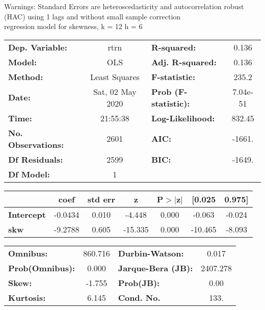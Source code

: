 Warnings: \newline
 [1] Standard Errors are heteroscedasticity and autocorrelation robust (HAC) using 1 lags and without small sample correction\\ 

regression model for skewness, k = 12 h = 6\begin{center}
\begin{tabular}{lclc}
\toprule
\textbf{Dep. Variable:}    &       rtrn       & \textbf{  R-squared:         } &     0.136   \\
\textbf{Model:}            &       OLS        & \textbf{  Adj. R-squared:    } &     0.136   \\
\textbf{Method:}           &  Least Squares   & \textbf{  F-statistic:       } &     235.2   \\
\textbf{Date:}             & Sat, 02 May 2020 & \textbf{  Prob (F-statistic):} &  7.04e-51   \\
\textbf{Time:}             &     21:55:38     & \textbf{  Log-Likelihood:    } &    832.45   \\
\textbf{No. Observations:} &        2601      & \textbf{  AIC:               } &    -1661.   \\
\textbf{Df Residuals:}     &        2599      & \textbf{  BIC:               } &    -1649.   \\
\textbf{Df Model:}         &           1      & \textbf{                     } &             \\
\bottomrule
\end{tabular}
\begin{tabular}{lcccccc}
                   & \textbf{coef} & \textbf{std err} & \textbf{z} & \textbf{P$> |$z$|$} & \textbf{[0.025} & \textbf{0.975]}  \\
\midrule
\textbf{Intercept} &      -0.0434  &        0.010     &    -4.448  &         0.000        &       -0.063    &       -0.024     \\
\textbf{skw}       &      -9.2788  &        0.605     &   -15.335  &         0.000        &      -10.465    &       -8.093     \\
\bottomrule
\end{tabular}
\begin{tabular}{lclc}
\textbf{Omnibus:}       & 860.716 & \textbf{  Durbin-Watson:     } &    0.017  \\
\textbf{Prob(Omnibus):} &   0.000 & \textbf{  Jarque-Bera (JB):  } & 2407.278  \\
\textbf{Skew:}          &  -1.755 & \textbf{  Prob(JB):          } &     0.00  \\
\textbf{Kurtosis:}      &   6.145 & \textbf{  Cond. No.          } &     133.  \\
\bottomrule
\end{tabular}
\end{center}

